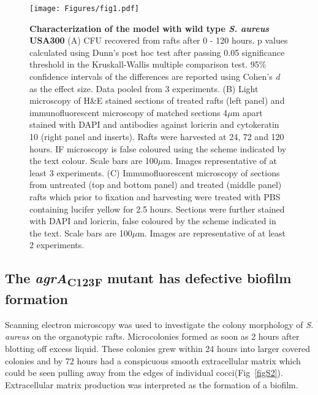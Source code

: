 \documentclass[10pt,letterpaper]{article}
\begin{document}
\begin{figure}[!ht]
\begin{adjustwidth}{-2.25in}{0in}
\texttt{[image: Figures/fig1.pdf]}
\caption[Characterization of the model with wild type \textit{S. aureus} USA300]{
	\textbf{Characterization of the model with wild type \textit{S. aureus} USA300}
	(A) CFU recovered from rafts after 0 - 120 hours. p values calculated using Dunn's post hoc test after passing 0.05 significance threshold in the Kruskall-Wallis multiple comparison test. 95\% confidence intervals of the differences are reported using Cohen's \textit{d} as the effect size. Data pooled from 3 experiments.
	(B) Light microscopy of H\&E stained sections of treated rafts (left panel) and immunofluorescent microscopy of matched sections 4$\mu$m apart stained with DAPI and antibodies against loricrin and cytokeratin 10 (right panel and inserts). Rafts were harvested at 24, 72 and 120 hours. IF microscopy is false coloured using the scheme indicated by the text colour. Scale bars are 100$\mu$m. Images representative of at least 3 experiments.
	(C) Immunofluorescent microscopy of sections from untreated (top and bottom panel) and treated (middle panel) rafts which prior to fixation and harvesting were treated with PBS containing lucifer yellow for 2.5 hours. Sections were further stained with DAPI and loricrin, false coloured by the scheme indicated in the text. Scale bars are 100$\mu$m. Images are representative of at least 2 experiments.}
    \label{fig1}
    \end{adjustwidth}
\end{figure}

\subsection*{The \textit{agrA}\textsubscript{C123F} mutant has defective biofilm formation}

Scanning electron microscopy was used to investigate the colony morphology of \textit{S. aureus} on the organotypic rafts.
Microcolonies formed as soon as 2 hours after blotting off excess liquid.
These colonies grew within 24 hours into larger covered colonies and by 72 hours had a conspicuous smooth extracellular matrix which could be seen pulling away from the edges of individual cocci(Fig~\ref{figS2}).
Extracellular matrix production was interpreted as the formation of a biofilm.
\end{document}
